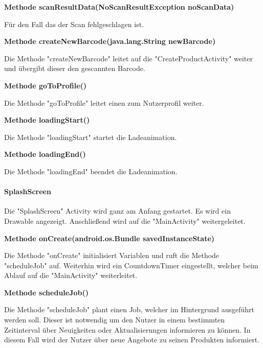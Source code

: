 \documentclass{scrartcl}
\begin{document}
\noindent\textbf{Methode scanResultData(NoScanResultException noScanData)}

\noindent Für den Fall das der Scan fehlgeschlagen ist. \newline

\noindent\textbf{Methode createNewBarcode(java.lang.String newBarcode)}

\noindent Die Methode "createNewBarcode" leitet auf die "CreateProductActivity" weiter und übergibt dieser den gescannten Barcode. \newline

\noindent\textbf{Methode goToProfile()}

\noindent Die Methode "goToProfile" leitet einen zum Nutzerprofil weiter. \newline

\noindent\textbf{Methode loadingStart()}

\noindent Die Methode "loadingStart" startet die Ladeanimation. \newline

\noindent\textbf{Methode loadingEnd()}

\noindent Die Methode "loadingEnd" beendet die Ladeanimation. \newline

\newpage

\paragraph{SplashScreen}

Die "SplashScreen" Activity wird ganz am Anfang gestartet. Es wird ein Drawable angezeigt. Anschließend wird auf die "MainActivity" weitergeleitet. \newline

\noindent\textbf{Methode onCreate(android.os.Bundle savedInstanceState)}

\noindent Die Methode "onCreate" initialisiert Variablen und ruft die Methode "scheduleJob" auf. Weiterhin wird ein CountdownTimer eingestellt, welcher beim Ablauf auf die "MainActivity" weiterleitet. \newline

\noindent\textbf{Methode scheduleJob()}

\noindent Die Methode "scheduleJob" plant einen Job, welcher im Hintergrund ausgeführt werden soll. Dieser ist notwendig um den Nutzer in einem bestimmten Zeitinterval über Neuigkeiten oder Aktualisierungen informieren zu können. In diesem Fall wird der Nutzer über neue Angebote zu seinen Produkten informiert. \newline
\end{document}
